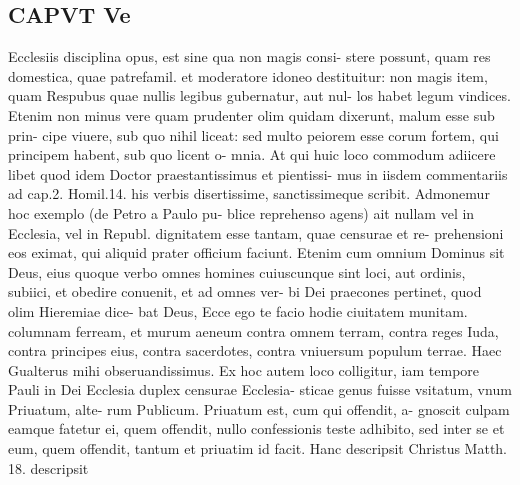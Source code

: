 \documentclass{article}
\begin{document}
\begin{pages}
\section*{CAPVT  Ve }
\marginpar{[ p.319 ]}\pstart Ecclesiis disciplina opus, est sine qua non magis consi- stere possunt, quam res domestica, quae patrefamil. et moderatore idoneo destituitur: non magis item, quam Respubus quae nullis legibus gubernatur, aut nul- los habet legum vindices. Etenim non minus vere quam prudenter olim quidam dixerunt, malum esse sub prin- cipe viuere, sub quo nihil liceat: sed multo peiorem esse corum fortem, qui principem habent, sub quo licent o- mnia. At qui huic loco commodum adiicere libet quod idem Doctor praestantissimus et pientissi- mus in iisdem commentariis ad cap.2. Homil.14. his verbis disertissime, sanctissimeque scribit. Admonemur hoc exemplo (de Petro a Paulo pu- blice reprehenso agens) ait nullam vel in Ecclesia, vel in Republ. dignitatem esse tantam, quae censurae et re- prehensioni eos eximat, qui aliquid prater officium faciunt. Etenim cum omnium Dominus sit Deus, eius quoque verbo omnes homines cuiuscunque sint loci, aut ordinis, subiici, et obedire conuenit, et ad omnes ver- bi Dei praecones pertinet, quod olim Hieremiae dice- bat Deus, Ecce ego te facio hodie ciuitatem munitam. columnam ferream, et murum aeneum contra omnem terram, contra reges Iuda, contra principes eius, contra sacerdotes, contra vniuersum populum terrae. Haec Gualterus mihi obseruandissimus. Ex hoc autem loco colligitur, iam tempore Pauli in Dei Ecclesia duplex censurae Ecclesia- sticae genus fuisse vsitatum, vnum Priuatum, alte- rum Publicum. Priuatum est, cum qui offendit, a- gnoscit culpam eamque fatetur ei, quem offendit, nullo confessionis teste adhibito, sed inter se et eum, quem offendit, tantum et priuatim id facit. Hanc descripsit Christus Matth. 18. descripsit  \pend

\end{pages}
\end{document}
